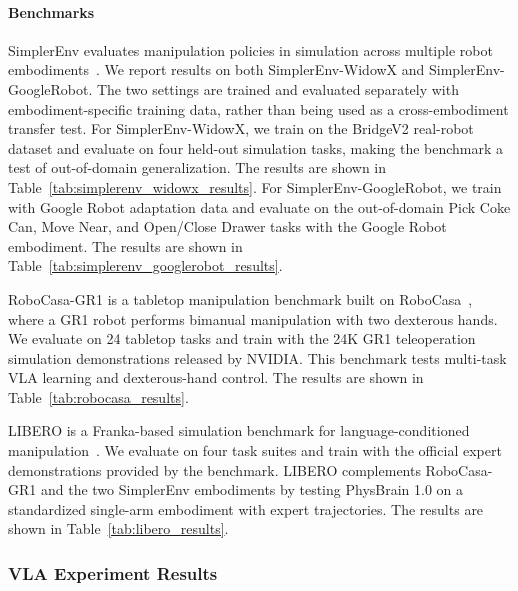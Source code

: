 \paragraph{Benchmarks}
SimplerEnv evaluates manipulation policies in simulation across multiple robot embodiments~\cite{SimplerEnv_2024_CoRL}. We report results on both SimplerEnv-WidowX and SimplerEnv-GoogleRobot. The two settings are trained and evaluated separately with embodiment-specific training data, rather than being used as a cross-embodiment transfer test. For SimplerEnv-WidowX, we train on the BridgeV2 real-robot dataset and evaluate on four held-out simulation tasks, making the benchmark a test of out-of-domain generalization. The results are shown in Table~\ref{tab:simplerenv_widowx_results}. For SimplerEnv-GoogleRobot, we train with Google Robot adaptation data and evaluate on the out-of-domain Pick Coke Can, Move Near, and Open/Close Drawer tasks with the Google Robot embodiment. The results are shown in Table~\ref{tab:simplerenv_googlerobot_results}.

RoboCasa-GR1 is a tabletop manipulation benchmark built on RoboCasa~\cite{RoboCasa_2024_RSS}, where a GR1 robot performs bimanual manipulation with two dexterous hands. We evaluate on 24 tabletop tasks and train with the 24K GR1 teleoperation simulation demonstrations released by NVIDIA. This benchmark tests multi-task VLA learning and dexterous-hand control. The results are shown in Table~\ref{tab:robocasa_results}.

LIBERO is a Franka-based simulation benchmark for language-conditioned manipulation~\cite{LIBERO_2023_NeurIPS}. We evaluate on four task suites and train with the official expert demonstrations provided by the benchmark. LIBERO complements RoboCasa-GR1 and the two SimplerEnv embodiments by testing PhysBrain 1.0 on a standardized single-arm embodiment with expert trajectories. The results are shown in Table~\ref{tab:libero_results}.

\subsubsection{VLA Experiment Results}





